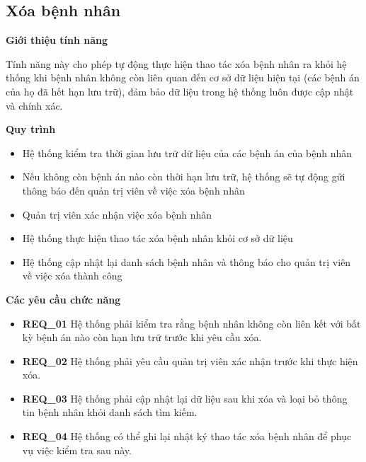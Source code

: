 \subsection{Xóa bệnh nhân}

\noindent \textbf{Giới thiệu tính năng}

Tính năng này cho phép tự động thực hiện thao tác xóa bệnh nhân ra khỏi hệ thống khi bệnh nhân không còn liên quan đến cơ sở dữ liệu hiện tại (các bệnh án của họ đã hết hạn lưu trữ), đảm bảo dữ liệu trong hệ thống luôn được cập nhật và chính xác.

\noindent \textbf{Quy trình}

\begin{itemize}

\item Hệ thống kiểm tra thời gian lưu trữ dữ liệu của các bệnh án của bệnh nhân

\item Nếu không còn bệnh án nào còn thời hạn lưu trữ, hệ thống sẽ tự động gửi thông báo đến quản trị viên về việc xóa bệnh nhân

\item Quản trị viên xác nhận việc xóa bệnh nhân

\item Hệ thống thực hiện thao tác xóa bệnh nhân khỏi cơ sở dữ liệu

\item Hệ thống cập nhật lại danh sách bệnh nhân và thông báo cho quản trị viên về việc xóa thành công


\end{itemize}

\noindent \textbf{Các yêu cầu chức năng}

\begin{itemize}
    
\item \textbf{REQ\_01} Hệ thống phải kiểm tra rằng bệnh nhân không còn liên kết với bất kỳ bệnh án nào còn hạn lưu trữ trước khi yêu cầu xóa.

\item \textbf{REQ\_02} Hệ thống phải yêu cầu quản trị viên xác nhận trước khi thực hiện xóa.

\item \textbf{REQ\_03} Hệ thống phải cập nhật lại dữ liệu sau khi xóa và loại bỏ thông tin bệnh nhân khỏi danh sách tìm kiếm.

\item \textbf{REQ\_04} Hệ thống có thể ghi lại nhật ký thao tác xóa bệnh nhân để phục vụ việc kiểm tra sau này.

\end{itemize}

